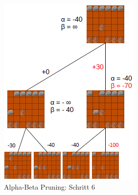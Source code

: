 \begin{figure}[h]
	\centering
	\includegraphics{img/ab6}
	\caption{Alpha-Beta Pruning: Schritt 6}
	\label{fig:ab6}
\end{figure}

